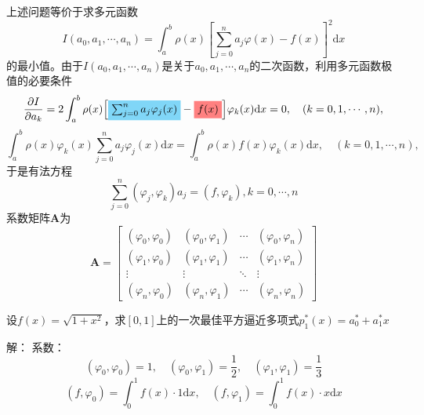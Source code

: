 \begin{note}
    上述问题等价于求多元函数
    \[
        I(a_0,a_1,\cdots,a_n) = \int_{a}^{b}\rho(x)\left[ \sum\limits_{j = 0}^{n}a_{j}\varphi(x)-f(x) \right]^2\mathrm{d}x
    \]
    的最小值。由于$I(a_0,a_1,\cdots,a_n)$是关于$a_0,a_1,\cdots,a_n$的二次函数，利用多元函数极值的必要条件
    \[
        \dfrac{\partial I}{\partial a_k}=2\int_a^b\rho(x)\Big[\colorbox{cyan!50}{$\sum_{j=0}^na_j\varphi_j(x)$}-\colorbox{red!50}{$f(x)$}\Big]\varphi_{k}(x)\mathrm{d}x=0,\quad(k=0,1,\cdots,n),
    \]
    \[
        \int_a^b\rho(x)\varphi_k(x)\sum_{j=0}^na_j\varphi_j(x)\mathrm{d}x= \int_a^b\rho(x)f(x)\varphi_k(x)\mathrm{d}x,\quad(k=0,1,\cdots,n),
    \]
    于是有\colorbox{red!50}{法方程}
    \[
        \sum\limits_{j = 0}^n(\varphi_j,\varphi_k)a_{j} = (f,\varphi_k),k = 0,\cdots,n
    \]
    系数矩阵$\boldsymbol{A}$为
    \[
        \boldsymbol{A} = 
        \begin{bmatrix}
            (\varphi_0,\varphi_0) & (\varphi_0,\varphi_1) & \cdots & (\varphi_0,\varphi_n) \\
            (\varphi_1,\varphi_0) & (\varphi_1,\varphi_1) & \cdots & (\varphi_1,\varphi_n) \\
            \vdots & \vdots & \ddots & \vdots \\
            (\varphi_n,\varphi_0) & (\varphi_n,\varphi_1) & \cdots & (\varphi_n,\varphi_n)
        \end{bmatrix}
    \]
\end{note}
\begin{example}
    设$f(x) = \sqrt{1+x^2}$，求$[0,1]$上的一次最佳平方逼近多项式$p_1^*(x) = a_0^*+a_1^*x$
    
    解：
    系数：
    \[
        (\varphi_0,\varphi_0) = 1,\quad (\varphi_0,\varphi_1) = \dfrac{1}{2},\quad(\varphi_1,\varphi_1) = \dfrac{1}{3}
    \]
    \[
        (f,\varphi_0) = \int_{0}^{1}f(x)\cdot 1\mathrm{d} x,\quad (f,\varphi_1) = \int_{0}^{1}f(x)\cdot x\mathrm{d} x
    \]
\end{example}
